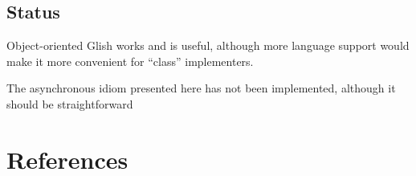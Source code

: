 \subsection{Status}
Object-oriented Glish works and is useful, although more language
support would make it more convenient for ``class'' implementers.

The asynchronous idiom presented here has not been implemented,
although it should be straightforward

\section{References}



